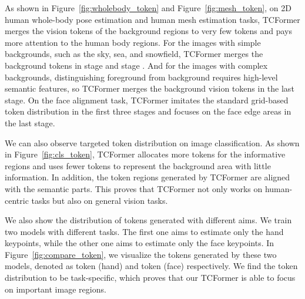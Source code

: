 \documentclass[10pt,twocolumn,letterpaper]{article}
\begin{document}
As shown in Figure~\ref{fig:wholebody_token} and Figure~\ref{fig:mesh_token}, on 2D human whole-body pose estimation and human mesh estimation tasks, TCFormer merges the vision tokens of the background regions to very few tokens and pays more attention to the human body regions. For the images with simple backgrounds, such as the sky, sea, and snowfield, TCFormer merges the background tokens in stage  and stage . And for the images with complex backgrounds, distinguishing foreground from background requires high-level semantic features, so TCFormer merges the background vision tokens in the last stage.
On the face alignment task, TCFormer imitates the standard grid-based token distribution in the first three stages and focuses on the face edge areas in the last stage.

We can also observe targeted token distribution on image classification.
As shown in Figure~\ref{fig:cls_token}, TCFormer allocates more tokens for the informative regions and uses fewer tokens to represent the background area with little information. 
In addition, the token regions generated by TCFormer are aligned with the semantic parts.
This proves that TCFormer not only works on human-centric tasks but also on general vision tasks.


We also show the distribution of tokens generated with different aims. We train two models with different tasks. The first one aims to estimate only the hand keypoints, while the other one aims to estimate only the face keypoints. 
In Figure~\ref{fig:compare_token}, we visualize the tokens generated by these two models, denoted as token (hand) and token (face) respectively. We find the token distribution to be task-specific, which proves that our TCFormer is able to focus on important image regions.








\begin{table*}[ht]
	\caption{
	Detailed settings of TCFormer series.  and  denotes the height and width of input images respectively.
	}
	\label{tab:setting}
	\begin{center}
	\end{center}
\end{table*}
\end{document}
